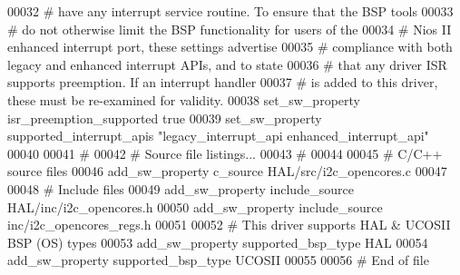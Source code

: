 \begin{DoxyCode}
00032 \textcolor{comment}{}\textcolor{comment}{# have any interrupt service routine. To ensure that the BSP tools}
00033 \textcolor{comment}{}\textcolor{comment}{# do not otherwise limit the BSP functionality for users of the}
00034 \textcolor{comment}{}\textcolor{comment}{# Nios II enhanced interrupt port, these settings advertise }
00035 \textcolor{comment}{}\textcolor{comment}{# compliance with both legacy and enhanced interrupt APIs, and to state}
00036 \textcolor{comment}{}\textcolor{comment}{# that any driver ISR supports preemption. If an interrupt handler}
00037 \textcolor{comment}{}\textcolor{comment}{# is added to this driver, these must be re-examined for validity.}
00038 \textcolor{comment}{}set\_sw\_property isr\_preemption\_supported true\textcolor{comment}{}
00039 \textcolor{comment}{}set\_sw\_property supported\_interrupt\_apis "legacy\_interrupt\_api enhanced\_interrupt\_api"\textcolor{comment}{}
00040 \textcolor{comment}{}
00041 \textcolor{comment}{#}
00042 \textcolor{comment}{}\textcolor{comment}{# Source file listings...}
00043 \textcolor{comment}{}\textcolor{comment}{#}
00044 \textcolor{comment}{}
00045 \textcolor{comment}{# C/C++ source files}
00046 \textcolor{comment}{}add\_sw\_property c\_source HAL/src/i2c\_opencores.c\textcolor{comment}{}
00047 \textcolor{comment}{}
00048 \textcolor{comment}{# Include files}
00049 \textcolor{comment}{}add\_sw\_property include\_source HAL/inc/i2c\_opencores.h\textcolor{comment}{}
00050 \textcolor{comment}{}add\_sw\_property include\_source inc/i2c\_opencores\_regs.h\textcolor{comment}{}
00051 \textcolor{comment}{}
00052 \textcolor{comment}{# This driver supports HAL & UCOSII BSP (OS) types}
00053 \textcolor{comment}{}add\_sw\_property supported\_bsp\_type HAL\textcolor{comment}{}
00054 \textcolor{comment}{}add\_sw\_property supported\_bsp\_type UCOSII\textcolor{comment}{}
00055 \textcolor{comment}{}
00056 \textcolor{comment}{# End of file}
\end{DoxyCode}
